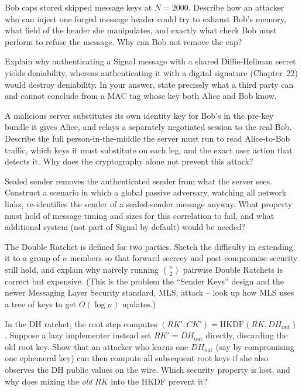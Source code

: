 \begin{exercise}
Bob caps stored skipped message keys at $N = 2000$. Describe how an attacker who can inject one forged message header could try to exhaust Bob's memory, what field of the header she manipulates, and exactly what check Bob must perform to refuse the message. Why can Bob not remove the cap?
\end{exercise}

\begin{exercise}
Explain why authenticating a Signal message with a shared Diffie-Hellman secret yields deniability, whereas authenticating it with a digital signature (Chapter~22) would destroy deniability. In your answer, state precisely what a third party can and cannot conclude from a MAC tag whose key both Alice and Bob know.
\end{exercise}

\begin{exercise}
A malicious server substitutes its own identity key for Bob's in the pre-key bundle it gives Alice, and relays a separately negotiated session to the real Bob. Describe the full person-in-the-middle the server must run to read Alice-to-Bob traffic, which keys it must substitute on each leg, and the exact user action that detects it. Why does the cryptography alone not prevent this attack?
\end{exercise}

\begin{exercise}
Sealed sender removes the authenticated sender from what the server sees. Construct a scenario in which a global passive adversary, watching all network links, re-identifies the sender of a sealed-sender message anyway. What property must hold of message timing and sizes for this correlation to fail, and what additional system (not part of Signal by default) would be needed?
\end{exercise}

\begin{exercise}
The Double Ratchet is defined for two parties. Sketch the difficulty in extending it to a group of $n$ members so that forward secrecy and post-compromise security still hold, and explain why naively running $\binom{n}{2}$ pairwise Double Ratchets is correct but expensive. (This is the problem the ``Sender Keys'' design and the newer Messaging Layer Security standard, MLS, attack -- look up how MLS uses a tree of keys to get $O(\log n)$ updates.)
\end{exercise}

\begin{exercise}
\label{ch27:ex-rootkdf}
In the DH ratchet, the root step computes $(RK', CK') = \mathrm{HKDF}(RK, DH_{\mathrm{out}})$. Suppose a lazy implementer instead set $RK' = DH_{\mathrm{out}}$ directly, discarding the old root key. Show that an attacker who learns one $DH_{\mathrm{out}}$ (say by compromising one ephemeral key) can then compute all subsequent root keys if she also observes the DH public values on the wire. Which security property is lost, and why does mixing the \emph{old} $RK$ into the HKDF prevent it?
\end{exercise}
